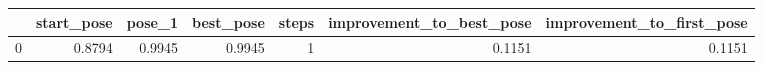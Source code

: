 \begin{tabular}{lrrrrrr}
\toprule
{} &  start\_pose &  pose\_1 &  best\_pose &  steps &  improvement\_to\_best\_pose &  improvement\_to\_first\_pose \\
\midrule
0 &      0.8794 &  0.9945 &     0.9945 &      1 &                    0.1151 &                     0.1151 \\
\bottomrule
\end{tabular}
